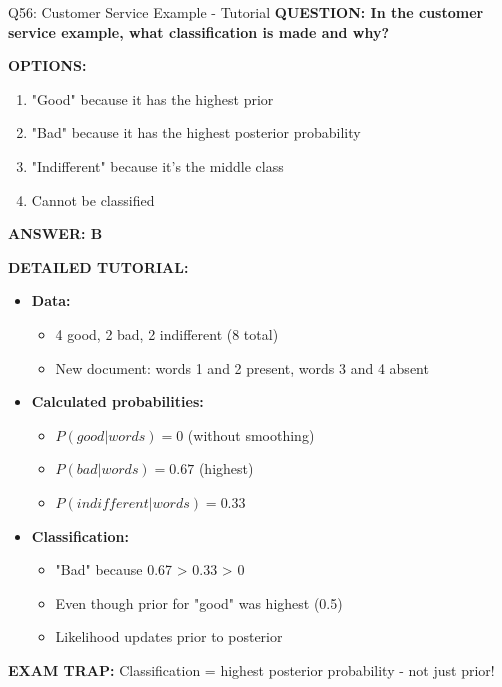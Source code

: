 \documentclass[8pt]{beamer}
\begin{document}
	\begin{frame}{Q56: Customer Service Example - Tutorial}
		\fontsize{6.5}{7.5}\selectfont
		\textbf{QUESTION: In the customer service example, what classification is made and why?}
		
		\vspace{0.1cm}
		\textbf{OPTIONS:}
		\begin{enumerate}
			\item "Good" because it has the highest prior
			\item "Bad" because it has the highest posterior probability
			\item "Indifferent" because it's the middle class
			\item Cannot be classified
		\end{enumerate}
		
		\vspace{0.1cm}
		\textcolor{myblue}{\textbf{ANSWER: B}}
		
		\vspace{0.1cm}
		\textbf{DETAILED TUTORIAL:}
		\begin{itemize}
			\item \textbf{Data:}
			\begin{itemize}
				\item 4 good, 2 bad, 2 indifferent (8 total)
				\item New document: words 1 and 2 present, words 3 and 4 absent
			\end{itemize}
			\item \textbf{Calculated probabilities:}
			\begin{itemize}
				\item $P(good|words) = 0$ (without smoothing)
				\item $P(bad|words) = 0.67$ (highest)
				\item $P(indifferent|words) = 0.33$
			\end{itemize}
			\item \textbf{Classification:}
			\begin{itemize}
				\item "Bad" because 0.67 > 0.33 > 0
				\item Even though prior for "good" was highest (0.5)
				\item Likelihood updates prior to posterior
			\end{itemize}
		\end{itemize}
		
		\textcolor{myred}{\textbf{EXAM TRAP:}} Classification = \textcolor{myblue}{highest posterior probability} - not just prior!
	\end{frame}
	
\end{document}
